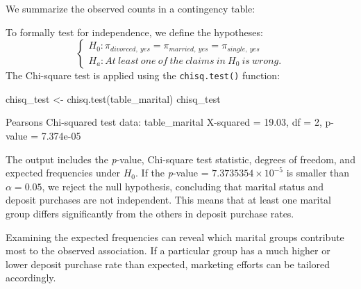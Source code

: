 \documentclass[
  11pt,
]{book}
\makeatletter
\newenvironment{Shaded}{}{}
\newcommand{\AttributeTok}[1]{#1}
\newcommand{\DecValTok}[1]{#1}
\newcommand{\FunctionTok}[1]{#1}
\newcommand{\NormalTok}[1]{#1}
\newcommand{\OtherTok}[1]{\textcolor[rgb]{0.39,0.39,0.39}{#1}}
\newcommand{\SpecialCharTok}[1]{\textcolor[rgb]{0.39,0.39,0.39}{#1}}
\newcommand{\StringTok}[1]{\textcolor[rgb]{0.39,0.39,0.39}{#1}}
\newenvironment{kframe}{%
\medskip{}
\setlength{\fboxsep}{.8em}
 \def\at@end@of@kframe{}%
 \ifinner\ifhmode%
  \def\at@end@of@kframe{\end{minipage}}%
  \begin{minipage}{\columnwidth}%
 \fi\fi%
 \def\FrameCommand##1{\hskip\@totalleftmargin \hskip-\fboxsep
 \colorbox{shadecolor}{##1}\hskip-\fboxsep
     \hskip-\linewidth \hskip-\@totalleftmargin \hskip\columnwidth}%
 \MakeFramed {\advance\hsize-\width
   \@totalleftmargin\z@ \linewidth\hsize
   \@setminipage}}%
 {\par\unskip\endMakeFramed%
 \at@end@of@kframe}
\renewenvironment{Shaded}{\begin{kframe}}{\end{kframe}}
\theoremstyle{definition}
\theoremstyle{definition}
\theoremstyle{definition}
\theoremstyle{definition}
\theoremstyle{remark}
\makeatother
\begin{document}
We summarize the observed counts in a contingency table:

\begin{Shaded}
\end{Shaded}

To formally test for independence, we define the hypotheses:
\[
\begin{cases}
    H_0: \pi_{divorced, \ yes} = \pi_{married, \ yes} = \pi_{single, \ yes}  \\
    H_a: At \ least \ one \ of \ the \ claims \ in \ H_0 \ is \ wrong.
\end{cases}
\]
The Chi-square test is applied using the \texttt{chisq.test()} function:

\begin{Shaded}
\begin{Highlighting}[]
\NormalTok{chisq\_test }\OtherTok{\textless{}{-}} \FunctionTok{chisq.test}\NormalTok{(table\_marital)}
\NormalTok{chisq\_test}
   
\NormalTok{    Pearson}\StringTok{\textquotesingle{}s Chi{-}squared test}
\StringTok{   }
\StringTok{   data:  table\_marital}
\StringTok{   X{-}squared = 19.03, df = 2, p{-}value = 7.374e{-}05}
\end{Highlighting}
\end{Shaded}

The output includes the \emph{p}-value, Chi-square test statistic, degrees of freedom, and expected frequencies under \(H_0\). If the \emph{p}-value = \ensuremath{7.3735354\times 10^{-5}} is smaller than \(\alpha = 0.05\), we reject the null hypothesis, concluding that marital status and deposit purchases are not independent. This means that at least one marital group differs significantly from the others in deposit purchase rates.

Examining the expected frequencies can reveal which marital groups contribute most to the observed association. If a particular group has a much higher or lower deposit purchase rate than expected, marketing efforts can be tailored accordingly.
\end{document}
